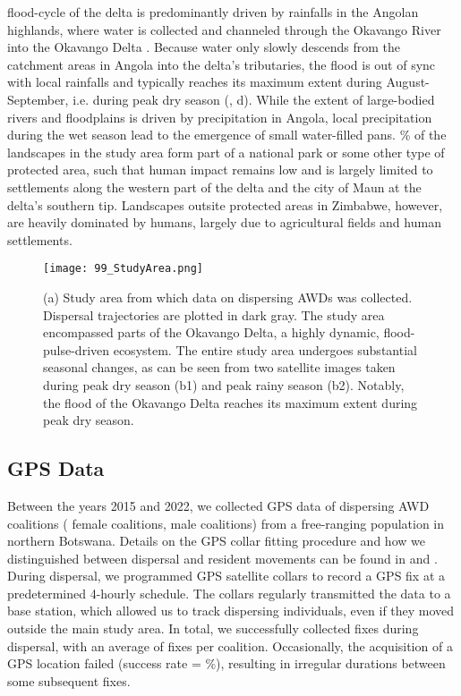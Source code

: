 \documentclass[abstract=on,10pt,a4paper,bibliography=totocnumbered]{article}
\newcommand{\inputy}[1]{\unskip}
\begin{document}
flood-cycle of the delta is predominantly driven by rainfalls in the Angolan
highlands, where water is collected and channeled through the Okavango River
into the Okavango Delta \citep{McCarthy.2003, Gumbricht.2004}. Because water
only slowly descends from the catchment areas in Angola into the delta's
tributaries, the flood is out of sync with local rainfalls and typically reaches
its maximum extent during August-September, i.e. during peak dry season
(\citealp{Wolski.2017}, d). While the extent of large-bodied
rivers and floodplains is driven by precipitation in Angola, local precipitation
during the wet season lead to the emergence of small water-filled pans.
\inputy{99_GeneralMetrics/PercentageProtected.tex}\% of the landscapes in the
study area form part of a national park or some other type of protected area,
such that human impact remains low and is largely limited to settlements along
the western part of the delta and the city of Maun at the delta's southern tip.
Landscapes outsite protected areas in Zimbabwe, however, are heavily dominated
by humans, largely due to agricultural fields and human settlements.

\begin{figure}
 \begin{center}
  \texttt{[image: 99\_StudyArea.png]}
  \caption{(a) Study area from which data on dispersing AWDs was collected.
  Dispersal trajectories are plotted in dark gray. The study area encompassed
  parts of the Okavango Delta, a highly dynamic, flood-pulse-driven ecosystem.
  The entire study area undergoes substantial seasonal changes, as can be seen
  from two satellite images taken during peak dry season (b1) and peak rainy
  season (b2). Notably, the flood of the Okavango Delta reaches its maximum
  extent during peak dry season.}
  \label{StudyArea}
 \end{center}
\end{figure}

\subsection{GPS Data}
Between the years 2015 and 2022, we collected GPS data of
\inputy{99_GeneralMetrics/CollarsTotal} dispersing AWD coalitions
(\inputy{99_GeneralMetrics/CollarsFemales} female coalitions,
\inputy{99_GeneralMetrics/CollarsMales} male coalitions) from a free-ranging
population in northern Botswana. Details on the GPS collar fitting procedure and
how we distinguished between dispersal and resident movements can be found in
\cite{Cozzi.2020} and \cite{Hofmann.2021}. During dispersal, we programmed GPS
satellite collars to record a GPS fix at a predetermined 4-hourly schedule. The
collars regularly transmitted the data to a base station, which allowed us to
track dispersing individuals, even if they moved outside the main study area. In
total, we successfully collected \inputy{99_GeneralMetrics/FixesTotal} fixes
during dispersal, with an average of \inputy{99_GeneralMetrics/FixesMeanSD}
fixes per coalition. Occasionally, the acquisition of a GPS location failed
(success rate = \inputy{99_GeneralMetrics/AcquisitionRate}\%), resulting in
irregular durations between some subsequent fixes.
\end{document}
